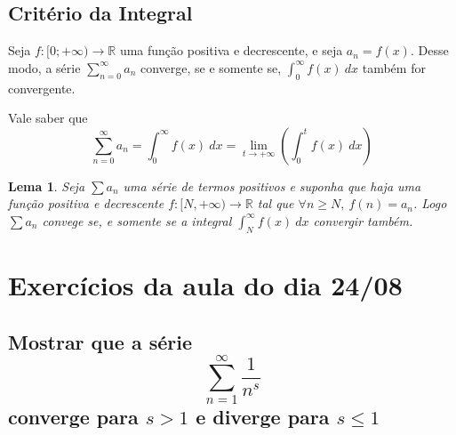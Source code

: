 \documentclass[12pt,openany, letterpaper]{book}
\newtheorem{lemma}{Lema}[section]
\begin{document}
\subsection{Critério da Integral}

\hspace{5mm} Seja $\displaystyle{f: [0;+\infty) \rightarrow \mathds{R}}$ uma função positiva e decrescente, e seja $a_n = f(x)$. Desse modo, a série $\displaystyle{\sum_{n=0}^{\infty} a_n}$ converge, se e somente se, $\displaystyle{\int_0^{\infty} f(x) \ dx}$ também for convergente. 

Vale saber que $$\sum_{n=0}^{\infty} a_n = \int_0^{\infty} f(x) \ dx = \lim_{t \rightarrow +\infty} \left( \int_0^t f(x) \ dx \right)$$

\begin{lemma}
Seja $\sum a_n$ uma série de termos positivos e suponha que haja uma função positiva e decrescente $f: [N, +\infty) \rightarrow \mathds{R}$ tal que $\forall n \geq N, \ f(n) = a_n$. Logo $\sum a_n$ convege se, e somente se a integral $\displaystyle{\int_N^{\infty}  f(x) \ dx }$ convergir também.
\end{lemma}

\section{Exercícios da aula do dia 24/08}
\label{sec:211}

\subsection*{Mostrar que a série $$\sum_{n = 1}^{\infty} \frac{1}{n^s}$$ converge para $s > 1$ e diverge para $s \leq 1$}
\end{document}
